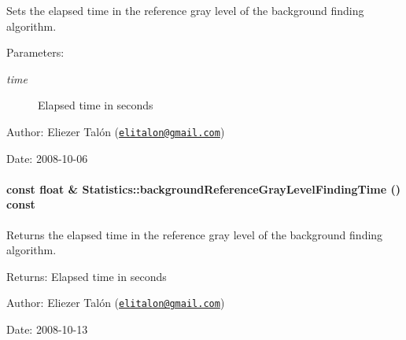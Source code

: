 Sets the elapsed time in the reference gray level of the background finding algorithm. 

\begin{Desc}
\item[Parameters:]
\begin{description}
\item[{\em time}]Elapsed time in seconds\end{description}
\end{Desc}
\begin{Desc}
\item[Author:]Eliezer Talón (\href{mailto:elitalon@gmail.com}{\tt elitalon@gmail.com}) \end{Desc}
\begin{Desc}
\item[Date:]2008-10-06 \end{Desc}
\hypertarget{class_statistics_d65adc1b3bd1d560408c5f9e06fde3d4}{
\paragraph[{backgroundReferenceGrayLevelFindingTime}]{\setlength{\rightskip}{0pt plus 5cm}const float \& Statistics::backgroundReferenceGrayLevelFindingTime () const}\hfill}
\label{class_statistics_d65adc1b3bd1d560408c5f9e06fde3d4}


Returns the elapsed time in the reference gray level of the background finding algorithm. 

\begin{Desc}
\item[Returns:]Elapsed time in seconds\end{Desc}
\begin{Desc}
\item[Author:]Eliezer Talón (\href{mailto:elitalon@gmail.com}{\tt elitalon@gmail.com}) \end{Desc}
\begin{Desc}
\item[Date:]2008-10-13 \end{Desc}


